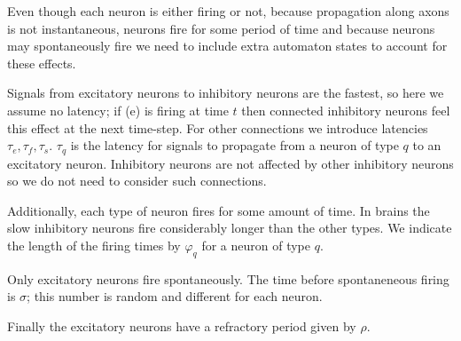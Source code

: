 \documentclass[12pt]{article}
\numberwithin{equation}{section}
\begin{document}
Even though each neuron is either firing or not, because propagation along axons is not instantaneous, neurons fire for some period of time and because neurons may spontaneously fire we need to include extra automaton states to account for these effects.

Signals from excitatory neurons to inhibitory neurons are the fastest, so here we assume no latency; if (e) is firing at time \(t\) then connected inhibitory neurons feel this effect at the next time-step. For other connections we introduce latencies \(\tau_e, \tau_f, \tau_s\). \(\tau_q\) is the latency for signals to propagate from a neuron of type \(q\) to an excitatory neuron. Inhibitory neurons are not affected by other inhibitory neurons so we do not need to consider such connections.

Additionally, each type of neuron fires for some amount of time. In brains the slow inhibitory neurons fire considerably longer than the other types. We indicate the length of the firing times by \(\varphi_q\) for a neuron of type \(q\).

Only excitatory neurons fire spontaneously. The time before spontaneneous firing is \(\sigma\); this number is random and different for each neuron.

Finally the excitatory neurons have a refractory period given by \(\rho\). 
\end{document}
